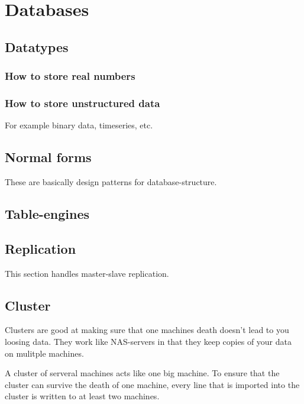 \section{Databases}

\subsection{Datatypes}

\subsubsection{How to store real numbers}

\subsubsection{How to store unstructured data}
For example binary data, timeseries, etc.

\subsection{Normal forms}
These are basically design patterns for database-structure. 

\subsection{Table-engines}


\subsection{Replication}
This section handles master-slave replication. 


\subsection{Cluster}

Clusters are good at making sure that one machines death doesn't lead to you loosing data. They work like NAS-servers in that they keep copies of your data on mulitple machines. 

A cluster of serveral machines acts like one big machine. To ensure that the cluster can survive the death of one machine, every line that is imported into the cluster is written to at least two machines. 
